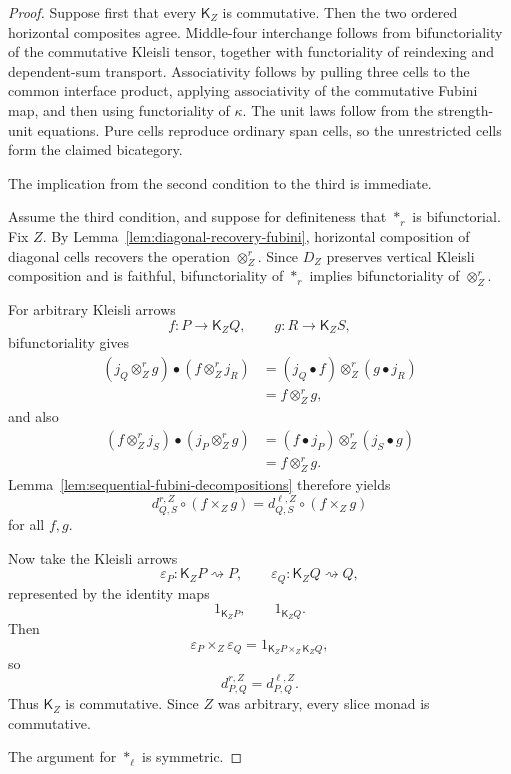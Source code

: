\begin{proof}
Suppose first that every \(\mathsf K_Z\) is commutative.  Then the two ordered
horizontal composites agree.  Middle-four interchange follows from
bifunctoriality of the commutative Kleisli tensor, together with
functoriality of reindexing and dependent-sum transport.  Associativity
follows by pulling three cells to the common interface product, applying
associativity of the commutative Fubini map, and then using functoriality of
\(\kappa\).  The unit laws follow from the strength-unit equations.  Pure
cells reproduce ordinary span cells, so the unrestricted cells form the
claimed bicategory.

The implication from the second condition to the third is immediate.

Assume the third condition, and suppose for definiteness that
\(\ast_r\) is bifunctorial.  Fix \(Z\).  By
Lemma~\ref{lem:diagonal-recovery-fubini}, horizontal composition of diagonal
cells recovers the operation \(\otimes_Z^r\).  Since \(D_Z\) preserves
vertical Kleisli composition and is faithful, bifunctoriality of
\(\ast_r\) implies bifunctoriality of \(\otimes_Z^r\).

For arbitrary Kleisli arrows
\[
    f:P\to\mathsf K_ZQ,
    \qquad
    g:R\to\mathsf K_ZS,
\]
bifunctoriality gives
\[
\begin{aligned}
    (j_Q\otimes_Z^rg)
    \bullet
    (f\otimes_Z^rj_R)
    &=
    (j_Q\bullet f)
    \otimes_Z^r
    (g\bullet j_R)
    \\
    &=
    f\otimes_Z^rg,
\end{aligned}
\]
and also
\[
\begin{aligned}
    (f\otimes_Z^rj_S)
    \bullet
    (j_P\otimes_Z^rg)
    &=
    (f\bullet j_P)
    \otimes_Z^r
    (j_S\bullet g)
    \\
    &=
    f\otimes_Z^rg.
\end{aligned}
\]
Lemma~\ref{lem:sequential-fubini-decompositions} therefore yields
\[
    d^{r,Z}_{Q,S}\circ(f\times_Zg)
    =
    d^{\ell,Z}_{Q,S}\circ(f\times_Zg)
\]
for all \(f,g\).

Now take the Kleisli arrows
\[
    \varepsilon_P:
    \mathsf K_ZP\rightsquigarrow P,
    \qquad
    \varepsilon_Q:
    \mathsf K_ZQ\rightsquigarrow Q,
\]
represented by the identity maps
\[
    1_{\mathsf K_ZP},
    \qquad
    1_{\mathsf K_ZQ}.
\]
Then
\[
    \varepsilon_P\times_Z\varepsilon_Q
    =
    1_{\mathsf K_ZP\times_Z\mathsf K_ZQ},
\]
so
\[
    d^{r,Z}_{P,Q}
    =
    d^{\ell,Z}_{P,Q}.
\]
Thus \(\mathsf K_Z\) is commutative.  Since \(Z\) was arbitrary, every slice
monad is commutative.

The argument for \(\ast_\ell\) is symmetric.
\end{proof}

